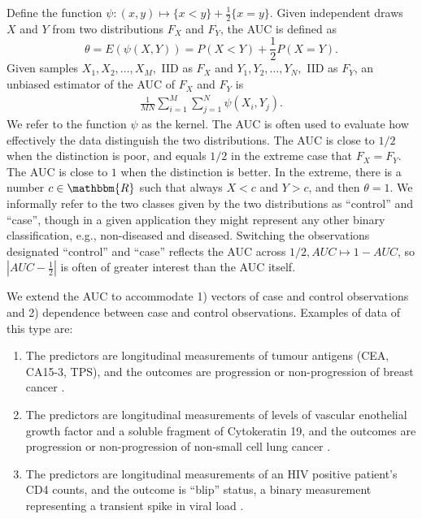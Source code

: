 \documentclass[12pt]{article}
\newcommand{\E}{E}
\renewcommand{\P}{P}
\newcommand{\kernel}{\psi}
\newcommand{\comment}[1]{
  \iftoggle{commenttoggle}{
    {\normalsize{\color{red}{ #1}}\normalsize}
  }
  {}
}
\begin{document}
Define the function
$\kernel:(x,y)\mapsto\{x<y\}+\frac{1}{2}\{x=y\}$. Given independent draws $X$ and $Y$ from two distributions $F_X$ and $F_Y$, the AUC is defined as
$$\theta=\E(\kernel(X,Y))=\P(X<Y)+\frac{1}{2}\P(X=Y).$$%
Given samples
$X_1,X_2,\ldots,X_M,$ IID as $F_X$ and $Y_1,Y_2,\ldots,Y_N,$ IID as
$F_Y$, an unbiased estimator of the AUC of $F_X$ and $F_Y$ is %
\begin{align}
  \frac{1}{MN}\sum_{i=1}^M\sum_{j=1}^N \psi(X_i,Y_j).
\end{align}
We refer to the function
$\kernel$ as the kernel. The AUC is often used to evaluate how
effectively the data distinguish the two distributions. The AUC is close to
$1/2$ when the distinction is poor, and equals $1/2$ in the extreme case that
$F_X=F_Y$. The AUC is close to $1$ when the distinction is better. In the extreme, there is a
number $c\in\mathbbm{R}$ such that always $X<c$ and
$Y>c$, and then
$\theta=1$. We informally refer to the two classes given by the two distributions as ``control'' and
``case'', though in a given application they might represent any other
binary classification, e.g., non-diseased and diseased. Switching the
observations designated ``control'' and ``case'' reflects the AUC
across $1/2, AUC\mapsto 1-AUC$, so
$|AUC-\frac{1}{2}|$ is often of greater interest than the AUC itself.



We extend the AUC to accommodate 1) vectors of case and control
observations and 2) dependence between case and control
observations. Examples of data of this type are:
\begin{enumerate}
\item The predictors are longitudinal measurements of tumour antigens
  (CEA, CA15-3, TPS), and the outcomes are progression or non-progression
  of breast cancer \citep{emir2000}.
\item The predictors are longitudinal measurements of levels of vascular
enothelial growth factor and a soluble fragment of Cytokeratin
19, and the outcomes are progression or non-progression of non-small cell
lung cancer \citep{wu2011}.
\item The predictors are longitudinal measurements of an HIV positive patient's CD4 counts, and the outcome is ``blip'' status, a binary measurement representing a transient spike in viral load \citep{michael2019}.
\end{enumerate}
\end{document}
